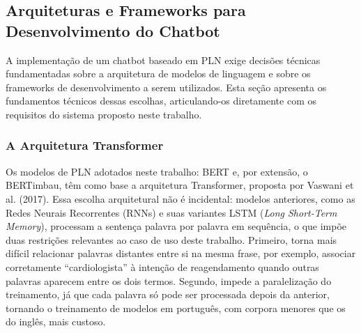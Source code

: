 \documentclass[12pt,a4paper]{extarticle}
\begin{document}
\subsection{Arquiteturas e Frameworks para Desenvolvimento do Chatbot}

A implementação de um chatbot baseado em PLN exige decisões técnicas fundamentadas sobre a arquitetura de modelos de linguagem e sobre os frameworks de desenvolvimento a serem utilizados. Esta seção apresenta os fundamentos técnicos dessas escolhas, articulando-os diretamente com os requisitos do sistema proposto neste trabalho.

\subsubsection{A Arquitetura Transformer}

%

Os modelos de PLN adotados neste trabalho: BERT e, por extensão, o BERTimbau, têm como base a arquitetura Transformer, proposta por Vaswani et al. (2017). Essa escolha arquitetural não é incidental: modelos anteriores, como as Redes Neurais Recorrentes (RNNs) e suas variantes LSTM (\textit{Long Short-Term Memory}), processam a sentença palavra por palavra em sequência, o que impõe duas restrições relevantes ao caso de uso deste trabalho. Primeiro, torna mais difícil relacionar palavras distantes entre si na mesma frase, por exemplo, associar corretamente ``cardiologista'' à intenção de reagendamento quando outras palavras aparecem entre os dois termos. Segundo, impede a paralelização do treinamento, já que cada palavra só pode ser processada depois da anterior, tornando o treinamento de modelos em português, com corpora menores que os do inglês, mais custoso.
\end{document}
